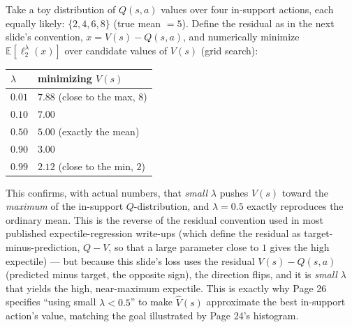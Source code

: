 Take a toy distribution of $Q(s,a)$ values over four in-support actions, each equally likely: $\{2,4,6,8\}$ (true mean $=5$). Define the residual as in the next slide's convention, $x = V(s) - Q(s,a)$, and numerically minimize $\mathbb{E}[\ell_2^\lambda(x)]$ over candidate values of $V(s)$ (grid search):
\begin{center}
\begin{tabular}{@{}ll@{}}
\toprule
$\lambda$ & minimizing $V(s)$ \\
\midrule
$0.01$ & $7.88$ (close to the max, $8$) \\
$0.10$ & $7.00$ \\
$0.50$ & $5.00$ (exactly the mean) \\
$0.90$ & $3.00$ \\
$0.99$ & $2.12$ (close to the min, $2$) \\
\bottomrule
\end{tabular}
\end{center}
This confirms, with actual numbers, that \emph{small} $\lambda$ pushes $V(s)$ toward the \emph{maximum} of the in-support $Q$-distribution, and $\lambda=0.5$ exactly reproduces the ordinary mean. This is the reverse of the residual convention used in most published expectile-regression write-ups (which define the residual as target-minus-prediction, $Q-V$, so that a large parameter close to $1$ gives the high expectile) --- but because this slide's loss uses the residual $V(s)-Q(s,a)$ (predicted minus target, the opposite sign), the direction flips, and it is \emph{small} $\lambda$ that yields the high, near-maximum expectile. This is exactly why Page 26 specifies ``using small $\lambda<0.5$'' to make $\hat V(s)$ approximate the best in-support action's value, matching the goal illustrated by Page 24's histogram.
